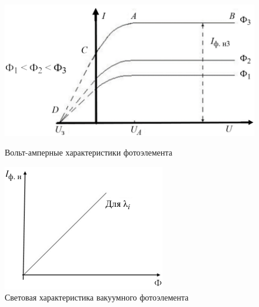 \begin{figure}[H]
    \centering
    \begin{minipage}{0.48\linewidth}
        \centering
        \def\thefigure{6.6}
        \protect{}
        \includegraphics[width=0.9\linewidth]{figs/6-6.png}
        \caption{Вольт-амперные характеристики фотоэлемента}
        \label{fig:va_char}
    \end{minipage}\hfill
    \begin{minipage}{0.48\linewidth}
        \centering
        \def\thefigure{6.7}
        \protect{}
        \includegraphics[width=0.9\linewidth]{figs/6-7.png}
        \caption{Световая характеристика вакуумного фотоэлемента}
        \label{fig:light_char}
    \end{minipage}
\end{figure}

\newpage
{}

